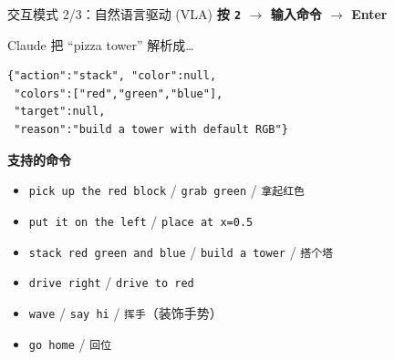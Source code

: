 \documentclass[aspectratio=169, 11pt]{beamer}
\begin{document}
\begin{frame}[fragile]{交互模式 2/3：自然语言驱动 (VLA)}
\textbf{按 \texttt{2} $\to$ 输入命令 $\to$ Enter}

\vspace{6pt}
\begin{exampleblock}{Claude 把 ``pizza tower'' 解析成…}
\begin{lstlisting}[language={}, basicstyle=\ttfamily\scriptsize]
{"action":"stack", "color":null,
 "colors":["red","green","blue"],
 "target":null,
 "reason":"build a tower with default RGB"}
\end{lstlisting}
\end{exampleblock}

\vspace{4pt}
\textbf{支持的命令}
\footnotesize
\begin{itemize}
\item \texttt{pick up the red block} / \texttt{grab green} / \texttt{拿起红色}
\item \texttt{put it on the left} / \texttt{place at x=0.5}
\item \texttt{stack red green and blue} / \texttt{build a tower} / \texttt{搭个塔}
\item \texttt{drive right} / \texttt{drive to red}
\item \texttt{wave} / \texttt{say hi} / \texttt{挥手}（装饰手势）
\item \texttt{go home} / \texttt{回位}
\end{itemize}
\end{frame}
\end{document}
